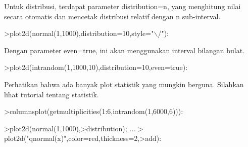 \documentclass[a4paper,10pt]{article}
\begin{document}
\begin{eulernotebook}
\begin{eulercomment}
\begin{eulercomment}
\begin{eulercomment}
\begin{eulercomment}
\begin{eulercomment}
\begin{eulercomment}
\begin{eulercomment}
\begin{eulercomment}
\begin{eulercomment}
\begin{eulercomment}
\begin{eulercomment}
\begin{eulercomment}
\begin{eulercomment}
\begin{eulercomment}
\begin{eulercomment}
\begin{eulercomment}
\begin{eulercomment}
\begin{eulercomment}
\begin{eulercomment}
\begin{eulercomment}
\begin{eulercomment}
\begin{eulercomment}
\begin{eulercomment}
\begin{eulercomment}
\begin{eulercomment}
\begin{eulercomment}
\begin{eulercomment}
\begin{eulercomment}
\begin{eulercomment}
\begin{eulercomment}
\begin{eulercomment}
\begin{eulercomment}
\begin{eulercomment}
\begin{eulercomment}
\begin{eulercomment}
\begin{eulercomment}
\begin{eulercomment}
Untuk distribusi, terdapat parameter distribution=n, yang menghitung
nilai secara otomatis dan mencetak distribusi relatif dengan n
sub-interval.
\end{eulercomment}
\begin{eulerprompt}
>plot2d(normal(1,1000),distribution=10,style="\(\backslash\)/"):
\end{eulerprompt}
\begin{eulercomment}
Dengan parameter even=true, ini akan menggunakan interval bilangan
bulat.
\end{eulercomment}
\begin{eulerprompt}
>plot2d(intrandom(1,1000,10),distribution=10,even=true):
\end{eulerprompt}
\begin{eulercomment}
Perhatikan bahwa ada banyak plot statistik yang mungkin berguna.
Silahkan lihat tutorial tentang statistik.
\end{eulercomment}
\begin{eulerprompt}
>columnsplot(getmultiplicities(1:6,intrandom(1,6000,6))):
\end{eulerprompt}
\begin{eulerprompt}
>plot2d(normal(1,1000),>distribution); ...
> plot2d("qnormal(x)",color=red,thickness=2,>add):
\end{eulerprompt}

\end{eulercomment}
\end{eulercomment}
\end{eulercomment}
\end{eulercomment}
\end{eulercomment}
\end{eulercomment}
\end{eulercomment}
\end{eulercomment}
\end{eulercomment}
\end{eulercomment}
\end{eulercomment}
\end{eulercomment}
\end{eulercomment}
\end{eulercomment}
\end{eulercomment}
\end{eulercomment}
\end{eulercomment}
\end{eulercomment}
\end{eulercomment}
\end{eulercomment}
\end{eulercomment}
\end{eulercomment}
\end{eulercomment}
\end{eulercomment}
\end{eulercomment}
\end{eulercomment}
\end{eulercomment}
\end{eulercomment}
\end{eulercomment}
\end{eulercomment}
\end{eulercomment}
\end{eulercomment}
\end{eulercomment}
\end{eulercomment}
\end{eulercomment}
\end{eulercomment}
\end{eulernotebook}
\end{document}
